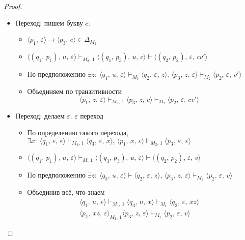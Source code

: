 \documentclass[a4paper,12pt]{article}
\theoremstyle{plain}
\theoremstyle{definition}
\theoremstyle{remark}
\begin{document}
\begin{proof}
\begin{itemize}
		\item Переход: пишем букву $c$:
		      \begin{itemize}
			      \item $\langle p_1,\,\varepsilon\rangle \to \langle p_3,\,c\rangle \in \Delta_{M_2}$
			      \item $\langle(q_1,\,p_1),\,u,\,\varepsilon\rangle\vdash_{M_2,\,1}\langle(q_1,\,p_3),\,u,\,c\rangle\vdash\langle(q_2,\,p_2),\,\varepsilon,\,cv'\rangle$
			      \item По предположению $\exists z :\: \langle q_1,\,u,\,\varepsilon\rangle\vdash_{M_1}\langle q_2,\,\varepsilon,\,z\rangle,\,\langle p_3,\,z,\,\varepsilon\rangle\vdash_{M_2}\langle p_2,\,\varepsilon,\,v'\rangle$
			      \item Объединяем по транзитивности
			            \[
				            \langle p_1,\,z,\,\varepsilon\rangle\vdash_{M_2,\,1}\langle p_3,\,z,\,c\rangle\vdash_{M_2}\langle p_2,\,\varepsilon,\,cv'\rangle
			            \]
		      \end{itemize}
		\item Переход: делаем $\varepsilon:\:\varepsilon$ переход
		      \begin{itemize}
			      \item По определению такого перехода, $\exists x :\: \langle q_1,\,\varepsilon,\,\varepsilon\rangle\vdash_{M_1,\,1}\langle q_3,\,\varepsilon,\,x\rangle,\, \langle p_1,\,x,\,\varepsilon\rangle\vdash_{M_2,\,1}\langle p_3,\,\varepsilon,\,\varepsilon\rangle$
			      \item $\langle(q_1,\,p_1),\,u,\,\varepsilon\rangle\vdash_{M,\,1}\langle(q_3,\,p_3),\,u,\,\varepsilon\rangle\vdash\langle(q_2,\,p_2),\,\varepsilon,\,v\rangle$
			      \item По предположению $\exists z :\: \langle q_3,\,u,\,\varepsilon\rangle\vdash\langle q_2,\,\varepsilon,\,z\rangle,\, \langle p_3,\,z,\,\varepsilon\rangle\vdash_{M_2}\langle p_2,\,\varepsilon,\,v\rangle$
			      \item Объединив всё, что знаем
			            \begin{align*}
				            \langle q_1,\,u,\,\varepsilon\rangle\vdash_{M_1,\,1}\langle q_3,\,u,\,x\rangle\vdash_{M_1}\langle q_2,\,\varepsilon,\,xz\rangle \\
				            \langle p_1,\,xz,\,\varepsilon\rangle_{M_2,\,1}\langle p_3,\,z,\,\varepsilon\rangle\vdash_{M_2}\langle p_2,\,\varepsilon,\,v\rangle
			            \end{align*}
		      \end{itemize}

\end{itemize}
\end{proof}
\end{document}
